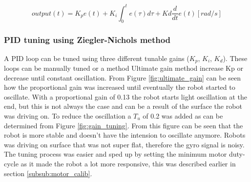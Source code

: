 \begin{equation}
output(t) = K_{p}e(t) + K_{i} \int_{0}^{t}e(\tau)d\tau + Kd\frac{d}{dt}e(t) [rad/s]
\end{equation}

\subsubsection{PID tuning using Ziegler-Nichols method}


A PID loop can be tuned using three different tunable gains ($K_{p}$, $K_{i}$, $K_{d}$).
These loops can be manually tuned or a method 
Ultimate gain method increase Kp or decrease until constant oscillation.
From Figure \ref{fig:ultimate_gain} can be seen how the proportional gain was increased until eventually the robot started to oscillate.
With a proportional gain of 0.13 the robot starts light oscillation at the end, but this is not always the case and can be a result of the surface the robot was driving on.
To reduce the oscillation a $T_{u}$ of 0.2 was added as can be determined from Figure \ref{fig:gain_tuning}.
From this figure can be seen that the robot is more stable and doesn't have the intension to oscillate anymore.
Robots was driving on surface that was not super flat, therefore the gyro signal is noisy.
The tuning process was easier and sped up by setting the minimum motor duty-cycle as it made the robot a lot more responsive, this was described earlier in section \ref{subsub:motor_calib}.


